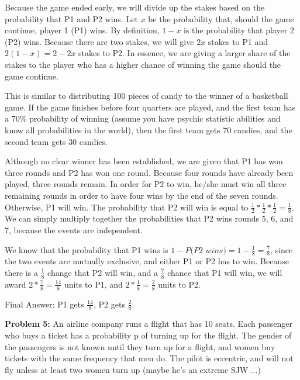 \documentclass{article}
\begin{document}
 Because the game ended early, we will divide up the stakes based on the probability that P1 and P2 wins. Let $x$ be the probability that, should the game continue, player 1 (P1) wins. By definition, $1-x$ is the probability that player 2 (P2) wins. Because there are two stakes, we will give $2x$ stakes to P1 and $2(1-x) = 2-2x$ stakes to P2. In essence, we are giving a larger share of the stakes to the player who has a higher chance of winning the game should the game continue. 
 
 This is similar to distributing 100 pieces of candy to the winner of a basketball game. If the game finishes before four quarters are played, and the first team has a 70\% probability of winning (assume you have psychic statistic abilities and know all probabilities in the world), then the first team gets 70 candies, and the second team gets 30 candies.
 
 Although no clear winner has been established, we are given that P1 has won three rounds and P2 has won one round. Because four rounds have already been played, three rounds remain. In order for P2 to win, he/she must win all three remaining rounds in order to have four wins by the end of the seven rounds. Otherwise, P1 will win. The probability that P2 will win is equal to $\frac{1}{2}*\frac{1}{2}*\frac{1}{2}=\frac{1}{8}$. We can simply multiply together the probabilities that P2 wins rounds 5, 6, and 7, because the events are independent. 
 
 We know that the probability that P1 wins is $1-P(P2$ $ wins)=1-\frac{1}{8}=\frac{7}{8}$, since the two events are mutually exclusive, and either P1 or P2 has to win. Because there is a $\frac{1}{8}$ change that P2 will win, and a $\frac{7}{8}$ chance that P1 will win, we will award $2*\frac{7}{8}=\frac{14}{8}$ units to P1, and $2*\frac{1}{8}=\frac{2}{8}$ units to P2.
 
 Final Answer: P1 gets $\frac{14}{8}$, P2 gets $\frac{2}{8}$.\newline
 
 \newpage
 
 \begin{center}
     \Large\textbf{Problem 5:} An airline company runs a flight that has 10 seats. Each passenger who buys a ticket has a probability p of turning up for the flight. The gender of the passengers is not known until they turn up for a flight, and women buy tickets with the same frequency that men do. The pilot is eccentric, and will not fly unless at least two women turn up (maybe he's an extreme SJW ...)\par
 \end{center}
 
\end{document}
